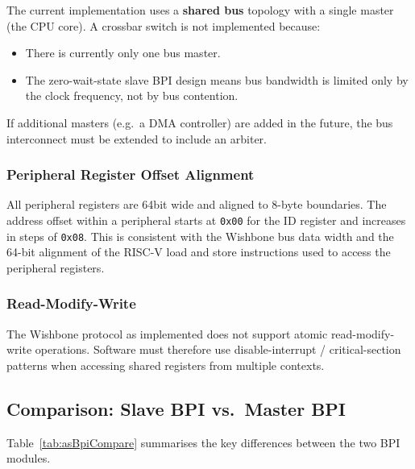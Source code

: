 The current implementation uses a \textbf{shared bus} topology with a
single master (the CPU core).
A crossbar switch is not implemented because:
\begin{itemize}
  \item There is currently only one bus master.
  \item The zero-wait-state slave BPI design means bus bandwidth is limited
    only by the clock frequency, not by bus contention.
\end{itemize}
If additional masters (e.g.\ a DMA controller) are added in the future,
the bus interconnect must be extended to include an arbiter.

\subsubsection{Peripheral Register Offset Alignment}

All peripheral registers are 64\;bit wide and aligned to 8-byte boundaries.
The address offset within a peripheral starts at \texttt{0x00} for the
ID register and increases in steps of \texttt{0x08}.
This is consistent with the Wishbone bus data width and the 64-bit
alignment of the RISC-V load and store instructions used to access the
peripheral registers.

\subsubsection{Read-Modify-Write}

The Wishbone protocol as implemented does not support atomic
read-modify-write operations.
Software must therefore use disable-interrupt / critical-section
patterns when accessing shared registers from multiple contexts.

\subsection{Comparison: Slave BPI vs.\ Master BPI}

Table~\ref{tab:asBpiCompare} summarises the key differences between the
two BPI modules.

